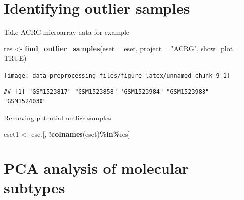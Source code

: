 \documentclass[
  12pt,
]{book}
\newenvironment{Shaded}{\begin{snugshade}}{\end{snugshade}}
\newcommand{\AttributeTok}[1]{\textcolor[rgb]{0.13,0.29,0.53}{#1}}
\newcommand{\ConstantTok}[1]{\textcolor[rgb]{0.56,0.35,0.01}{#1}}
\newcommand{\FunctionTok}[1]{\textcolor[rgb]{0.13,0.29,0.53}{\textbf{#1}}}
\newcommand{\NormalTok}[1]{#1}
\newcommand{\OtherTok}[1]{\textcolor[rgb]{0.56,0.35,0.01}{#1}}
\newcommand{\SpecialCharTok}[1]{\textcolor[rgb]{0.81,0.36,0.00}{\textbf{#1}}}
\newcommand{\StringTok}[1]{\textcolor[rgb]{0.31,0.60,0.02}{#1}}
\begin{document}
\hypertarget{identifying-outlier-samples}{%
\section{Identifying outlier samples}\label{identifying-outlier-samples}}

Take ACRG microarray data for example

\begin{Shaded}
\begin{Highlighting}[]
\NormalTok{res }\OtherTok{\textless{}{-}} \FunctionTok{find\_outlier\_samples}\NormalTok{(}\AttributeTok{eset =}\NormalTok{ eset, }\AttributeTok{project =} \StringTok{"ACRG"}\NormalTok{, }\AttributeTok{show\_plot =} \ConstantTok{TRUE}\NormalTok{)}
\end{Highlighting}
\end{Shaded}

\begin{center}\texttt{[image: data-preprocessing\_files/figure-latex/unnamed-chunk-9-1]} \end{center}

\begin{verbatim}
## [1] "GSM1523817" "GSM1523858" "GSM1523984" "GSM1523988" "GSM1524030"
\end{verbatim}

Removing potential outlier samples

\begin{Shaded}
\begin{Highlighting}[]
\NormalTok{eset1 }\OtherTok{\textless{}{-}}\NormalTok{ eset[, }\SpecialCharTok{!}\FunctionTok{colnames}\NormalTok{(eset)}\SpecialCharTok{\%in\%}\NormalTok{res]}
\end{Highlighting}
\end{Shaded}

\hypertarget{pca-analysis-of-molecular-subtypes}{%
\section{PCA analysis of molecular subtypes}\label{pca-analysis-of-molecular-subtypes}}
\end{document}
